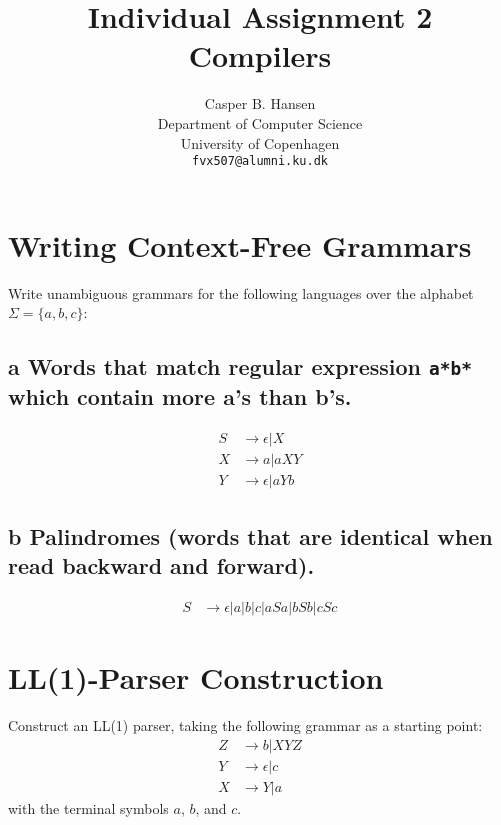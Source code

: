 \documentclass[11pt,a4paper]{article}
\title
{
	{\large Individual Assignment 2}\\
	Compilers
}
\author
{
	Casper B. Hansen\\
	Department of Computer Science\\
	University of Copenhagen\\
	{\tt fvx507@alumni.ku.dk}
}
\let\imp\to
\begin{document}
\clearpage
\maketitle

\section{Writing Context-Free Grammars}
Write unambiguous grammars for the following languages over the alphabet
$\Sigma = \{a, b, c\}$:

\subsection*{a \mdseries Words that match regular expression {\tt a*b*} which
contain more a's than b's.}
\begin{align*}
	S &\imp \epsilon | X \\
	X &\imp a|aXY \\
	Y &\imp \epsilon | aYb
\end{align*}

\subsection*{b \mdseries Palindromes (words that are identical when read
backward and forward).}
\begin{align*}
	S &\imp \epsilon | a | b | c | aSa | bSb | cSc
\end{align*}

\newpage
\section{LL(1)-Parser Construction}
Construct an LL(1) parser, taking the following grammar as a starting point:
\begin{align*}
	Z &\imp b | X Y Z \\
	Y &\imp \epsilon | c \\
	X &\imp Y | a
\end{align*}
with the terminal symbols $a$, $b$, and $c$.
\end{document}
